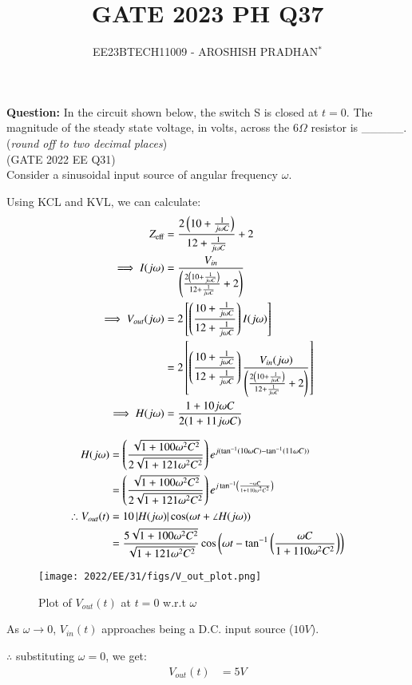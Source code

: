 \documentclass[journal,12pt,twocolumn]{IEEEtran}
\theoremstyle{remark}
\begin{document}

\vspace{3cm}

\title{GATE 2023 PH Q37}
\author{EE23BTECH11009 - AROSHISH PRADHAN$^{*}$%
}
\maketitle
\newpage
\bigskip
\textbf{Question:} In the circuit shown below, the switch S is closed at $t=0$. The magnitude of the steady state voltage, in volts, across the $6\Omega$ resistor is \_\_\_\_\_.(\textit{round off to two decimal places})\\ \hfill(GATE 2022 EE Q31)
\\

\solution 
\fi
Consider a sinusoidal input source of angular frequency $\omega$.


Using KCL and KVL, we can calculate:
\begin{align}
    Z_{\text{eff}} &= \frac{2\left(10 + \frac{1}{j\omega C}\right)}{12 + \frac{1}{j\omega C}} + 2\\
    \implies I(j\omega) &= \frac{V_{in}}{\left(\frac{2\left(10 + \frac{1}{j\omega C}\right)}{12 + \frac{1}{j \omega C}}+2\right)}\\
    \implies V_{out}(j\omega) &= 2{}\left[\left(\frac{10 + \frac{1}{j\omega C}}{12 + \frac{1}{j\omega C}}\right)I(j\omega)\right]\\
    &= 2{}\left[\left(\frac{10 + \frac{1}{j\omega C}}{12 + \frac{1}{j\omega C}}\right)\frac{V_{in}(j\omega)}{\left(\frac{2\left(10 + \frac{1}{j\omega C}\right)}{12 + \frac{1}{j \omega C}}+2\right)}\right]\\
    \implies H(j\omega) &= \frac{1 + 10j\omega C}{2(1 + 11j\omega C)}
\end{align}

\begin{align}
    H(j\omega) &= \left(\frac{\sqrt{1 + 100\omega^2 C^2}}{2\sqrt{1 + 121\omega^2 C^2}}\right)e^{j(\tan^{-1}(10\omega C) - \tan^{-1}(11\omega C))}\\
    &= \left(\frac{\sqrt{1 + 100\omega^2 C^2}}{2\sqrt{1 + 121\omega^2 C^2}}\right)e^{j\tan^{-1}\left(\frac{-\omega C}{1 + 110\omega^2 C^2}\right)}\\
    \therefore V_{out}(t) &= 10\left\vert H(j\omega)\right\vert\cos(\omega t + \angle H(j\omega))\\
    &= \frac{5\sqrt{1 + 100\omega^2 C^2}}{\sqrt{1 + 121\omega^2 C^2}}\cos\left(\omega t -\tan^{-1}\left(\frac{\omega C}{1 + 110\omega^2 C^2}\right)\right)
\end{align}
\begin{figure}[!h]
    \centering
    \texttt{[image: 2022/EE/31/figs/V\_out\_plot.png]}
    \caption{Plot of $V_{out}(t)$ at $t=0$ w.r.t $\omega$}
    \label{fig:3_gate.22.ee.31}
\end{figure}

As $\omega \rightarrow 0$, $V_{in}(t)$ approaches being a D.C. input source ($10V$).

$\therefore$ substituting $\omega = 0$, we get:
\begin{align}
    V_{out}(t) &= 5V
\end{align}

\end{document}
